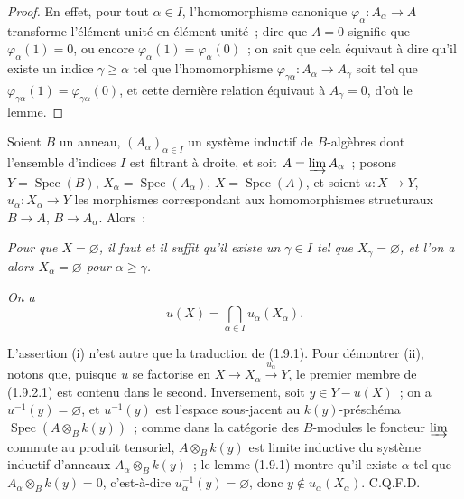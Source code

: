 \begin{proof}
En effet, pour tout $\alpha\in I$, l'homomorphisme canonique
$\varphi_\alpha:A_\alpha\to A$ transforme l'élément unité en élément unité~;
dire que $A=0$ signifie que $\varphi_\alpha(1)=0$, ou encore
$\varphi_\alpha(1)=\varphi_\alpha(0)$~; on sait que cela équivaut à dire
qu'il existe un indice $\gamma\geq\alpha$ tel que l'homomorphisme
$\varphi_{\gamma\alpha}:A_\alpha\to A_\gamma$ soit tel que
$\varphi_{\gamma\alpha}(1)=\varphi_{\gamma\alpha}(0)$, et cette dernière
relation équivaut à $A_\gamma=0$, d'où le lemme.
\end{proof}

\begin{proposition}[1.9.2]
\label{IV.1.9.2-fr}
Soient $B$ un anneau, $(A_\alpha)_{\alpha\in I}$ un système inductif de
$B$-algèbres dont l'ensemble d'indices $I$ est filtrant à droite, et soit
$A=\varinjlim A_\alpha$~; posons $Y=\operatorname{Spec}(B)$,
$X_\alpha=\operatorname{Spec}(A_\alpha)$, $X=\operatorname{Spec}(A)$, et
soient $u:X\to Y$, $u_\alpha:X_\alpha\to Y$ les morphismes correspondant aux
homomorphismes structuraux $B\to A$, $B\to A_\alpha$. Alors~:
\end{proposition}

\begin{env}[1.9.2.i]
\label{IV.1.9.2.i-fr}
\emph{Pour que $X=\varnothing$, il faut et il suffit qu'il existe un
$\gamma\in I$ tel que $X_\gamma=\varnothing$, et l'on a alors
$X_\alpha=\varnothing$ pour $\alpha\geq\gamma$.}
\end{env}


\begin{env}[1.9.2.ii]
\label{IV.1.9.2.ii-fr}
\emph{On a}
\[
  u(X)=\bigcap_{\alpha\in I}u_\alpha(X_\alpha). \tag{1.9.2.1}
  \label{IV.1.9.2.1-fr}
\]
\end{env}

L'assertion (i) n'est autre que la traduction de (1.9.1). Pour démontrer
(ii), notons que, puisque $u$ se factorise en
$X\to X_\alpha\xrightarrow{u_\alpha}Y$, le premier membre de (1.9.2.1) est
contenu dans le second. Inversement, soit $y\in Y-u(X)$~; on a
$u^{-1}(y)=\varnothing$, et $u^{-1}(y)$ est l'espace sous-jacent au
$k(y)$-préschéma $\operatorname{Spec}(A\otimes_Bk(y))$~; comme dans la
catégorie des $B$-modules le foncteur $\varinjlim$ commute au produit
tensoriel, $A\otimes_Bk(y)$ est limite inductive du système inductif d'anneaux
$A_\alpha\otimes_Bk(y)$~; le lemme (1.9.1) montre qu'il existe $\alpha$ tel
que $A_\alpha\otimes_Bk(y)=0$, c'est-à-dire
$u_\alpha^{-1}(y)=\varnothing$, donc $y\notin u_\alpha(X_\alpha)$. C.Q.F.D.

